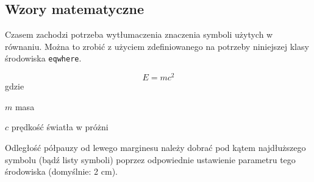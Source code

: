 \subsection{Wzory matematyczne}

Czasem zachodzi potrzeba wytłumaczenia znaczenia symboli użytych w równaniu. Można to zrobić z użyciem zdefiniowanego na potrzeby niniejszej klasy środowiska \texttt{eqwhere}.

\begin{equation}
E = mc^2
\end{equation}
gdzie
\begin{eqwhere}[2cm]
	\item[$m$] masa
	\item[$c$] prędkość światła w próżni
\end{eqwhere}

Odległość półpauzy od lewego marginesu należy dobrać pod kątem najdłuższego symbolu (bądź listy symboli) poprzez odpowiednie ustawienie parametru tego środowiska (domyślnie: 2 cm).
